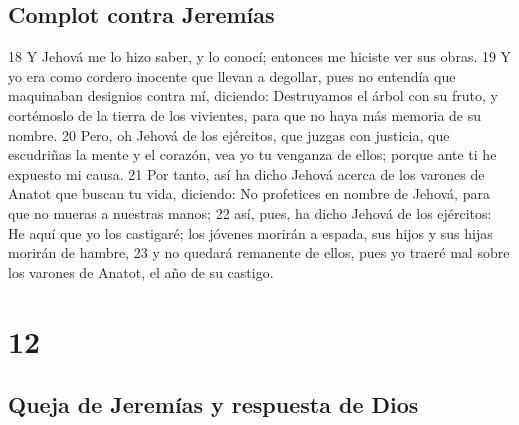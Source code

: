 \section*{Complot contra Jeremías}

18 Y Jehová me lo hizo saber, y lo conocí; entonces me hiciste ver sus obras.
19 Y yo era como cordero inocente que llevan a degollar, pues no entendía que maquinaban designios contra mí, diciendo: Destruyamos el árbol con su fruto, y cortémoslo de la tierra de los vivientes, para que no haya más memoria de su nombre.
20 Pero, oh Jehová de los ejércitos, que juzgas con justicia, que escudriñas la mente y el corazón, vea yo tu venganza de ellos; porque ante ti he expuesto mi causa.
21 Por tanto, así ha dicho Jehová acerca de los varones de Anatot que buscan tu vida, diciendo: No profetices en nombre de Jehová, para que no mueras a nuestras manos;
22 así, pues, ha dicho Jehová de los ejércitos: He aquí que yo los castigaré; los jóvenes morirán a espada, sus hijos y sus hijas morirán de hambre,
23 y no quedará remanente de ellos, pues yo traeré mal sobre los varones de Anatot, el año de su castigo.

\chapter{12}

\section*{Queja de Jeremías y respuesta de Dios}

